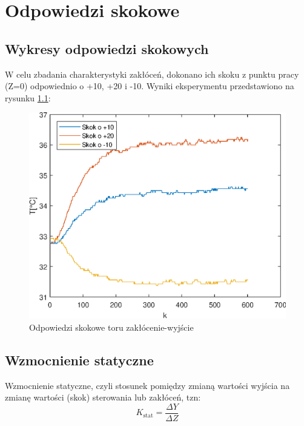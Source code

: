 \chapter {Odpowiedzi skokowe}

\section{Wykresy odpowiedzi skokowych}

W celu zbadania charakterystyki zakłóceń, dokonano ich skoku z punktu pracy (Z=0) odpowiednio o +10, +20 i -10. Wyniki eksperymentu przedstawiono na rysunku \ref{odp_skok}:

\begin{figure}[h!]

	\centering
	\includegraphics[scale=1]{Rys/LAB2_StepResponses_Z2.eps}
	\caption{Odpowiedzi skokowe toru zakłócenie-wyjście}
	\label{odp_skok}

\end{figure}


\section{Wzmocnienie statyczne}
\label{zad2_wzmocnienie}
Wzmocnienie statyczne, czyli stosunek pomiędzy zmianą wartości wyjścia na zmianę wartości (skok) sterowania lub zakłóceń, tzn:
\begin{equation}
K_{\mathrm{stat}} = \frac{\Delta Y}{\Delta Z}
\label{zad2_wzm_statyczne_wzor}
\end{equation}

